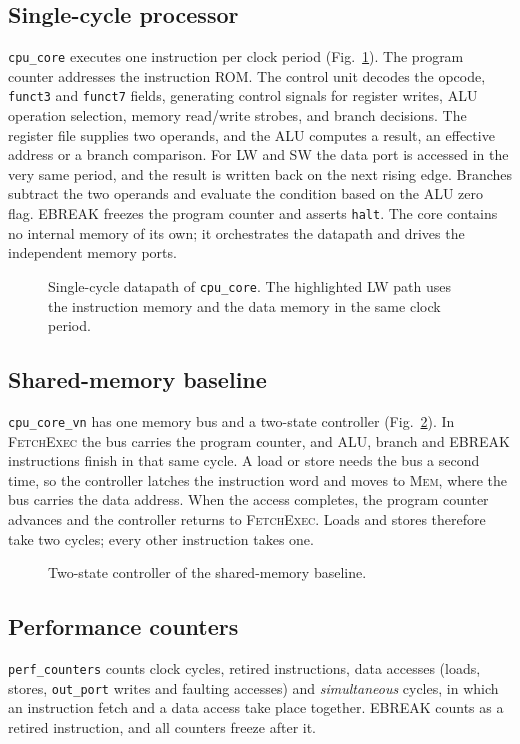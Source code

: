 \documentclass[conference]{IEEEtran}
\newcommand{\sig}[1]{\texttt{#1}}
\begin{document}
\subsection{Single-cycle processor}
\sig{cpu\_core} executes one instruction per clock period (Fig.~\ref{fig:datapath}). The program
counter addresses the instruction ROM. The control unit decodes the opcode, \sig{funct3} and
\sig{funct7} fields, generating control signals for register writes, ALU operation selection,
memory read/write strobes, and branch decisions. The register file supplies two operands, and
the ALU computes a result, an effective address or a branch comparison. For LW and SW the data
port is accessed in the very same period, and the result is written back on the next rising edge.
Branches subtract the two operands and evaluate the condition based on the ALU zero flag.
EBREAK freezes the program counter and asserts \sig{halt}. The core contains no internal memory
of its own; it orchestrates the datapath and drives the independent memory ports.

\begin{figure}[t]
  \centering
  \resizebox{0.94\columnwidth}{!}{}
  \caption{Single-cycle datapath of \sig{cpu\_core}. The highlighted LW path uses the
  instruction memory and the data memory in the same clock period.}
  \label{fig:datapath}
\end{figure}

\subsection{Shared-memory baseline}
\sig{cpu\_core\_vn} has one memory bus and a two-state controller (Fig.~\ref{fig:fsm}). In
\textsc{FetchExec} the bus carries the program counter, and ALU, branch and EBREAK instructions
finish in that same cycle. A load or store needs the bus a second time, so the controller latches
the instruction word and moves to \textsc{Mem}, where the bus carries the data address. When the
access completes, the program counter advances and the controller returns to \textsc{FetchExec}.
Loads and stores therefore take two cycles; every other instruction takes one.

\begin{figure}[t]
  \centering
  \resizebox{0.68\columnwidth}{!}{}
  \caption{Two-state controller of the shared-memory baseline.}
  \label{fig:fsm}
\end{figure}

\subsection{Performance counters}
\sig{perf\_counters} counts clock cycles, retired instructions, data accesses (loads, stores,
\sig{out\_port} writes and faulting accesses) and \emph{simultaneous} cycles, in which an
instruction fetch and a data access take place together. EBREAK counts as a retired
instruction, and all counters freeze after it.
\end{document}

